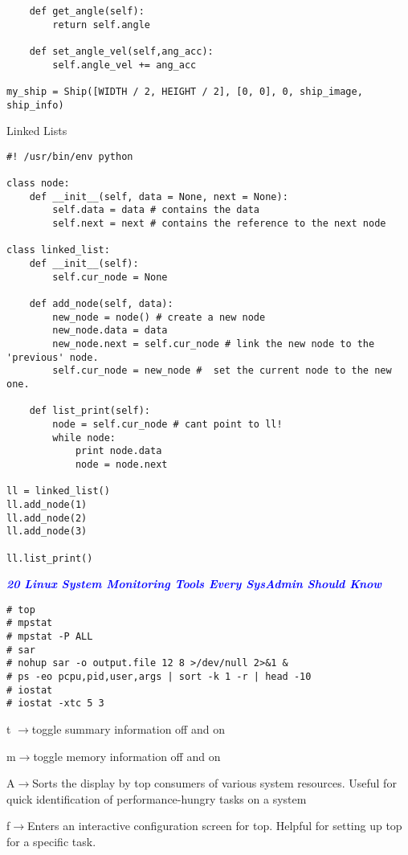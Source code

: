 \documentclass[9pt]{amsart}
\newcommand{\filldots}{\noindent \textbf {\textcolor {blue} {\dotfill}} }
\begin{document}
\begin{multicols}{2}
\begin{lstlisting}
    def get_angle(self):
        return self.angle 
        
    def set_angle_vel(self,ang_acc):
        self.angle_vel += ang_acc
        
my_ship = Ship([WIDTH / 2, HEIGHT / 2], [0, 0], 0, ship_image, ship_info)
\end{lstlisting}

Linked Lists
\begin{lstlisting}
#! /usr/bin/env python

class node:
    def __init__(self, data = None, next = None):
        self.data = data # contains the data
        self.next = next # contains the reference to the next node

class linked_list:
    def __init__(self):
        self.cur_node = None

    def add_node(self, data):
        new_node = node() # create a new node
        new_node.data = data
        new_node.next = self.cur_node # link the new node to the 'previous' node.
        self.cur_node = new_node #  set the current node to the new one.

    def list_print(self):
        node = self.cur_node # cant point to ll!
        while node:
            print node.data
            node = node.next

ll = linked_list()
ll.add_node(1)
ll.add_node(2)
ll.add_node(3)

ll.list_print()
\end{lstlisting}

\filldots 

\noindent \textbf {\textcolor {blue} {\em 20 Linux System Monitoring Tools Every SysAdmin Should Know}} 

\noindent {\textcolor {blue} {\em Process Activity Command}} 

\begin{lstlisting}
# top
# mpstat
# mpstat -P ALL
# sar
# nohup sar -o output.file 12 8 >/dev/null 2>&1 &
# ps -eo pcpu,pid,user,args | sort -k 1 -r | head -10
# iostat
# iostat -xtc 5 3
\end{lstlisting}

t $\to$toggle summary information off and on

m$\to$toggle memory information off and on

A$\to$Sorts the display by top consumers of various system resources. Useful for quick identification of performance-hungry tasks on a system

f$\to$Enters an interactive configuration screen for top. Helpful for setting up top for a specific task.


\end{multicols}
\end{document}
